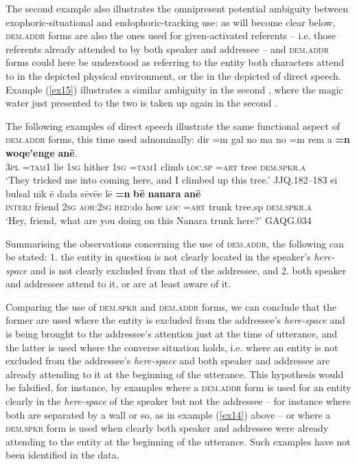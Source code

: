 \documentclass[output=paper
,modfonts
,nonflat]{langsci/langscibook}
\begin{document}
\noindent
The second example also illustrates the omnipresent potential ambiguity between exophoric-situational and endophoric-tracking use: as will become clear below, \textsc{dem.addr} forms are also the ones used for given-activated referents -- i.e. those referents already attended to by both speaker and addressee -- and \textsc{dem.addr} forms could here be understood as referring to the entity both characters attend to in the depicted physical environment, or the  in the depicted  of direct speech. Example (\ref{ex15}) illustrates a similar ambiguity in the second , where the magic water just presented to the two is taken up again in the second .

The following examples of direct speech illustrate the same functional aspect of \textsc{dem.addr} forms, this time used adnominally:
\ea	\label{ex21}
\gll		dir		=m		gal	no		ma	no		=m		rem	a			\textbf{=n}		\textbf{woqe'enge}	\textbf{an\=e}.	\\
\textsc{3pl}	\textsc{=tam1}	lie	\textsc{1sg}	hither		\textsc{1sg}	\textsc{=tam1}	climb	\textsc{loc.sp}	\textsc{=art}	tree			\textsc{dem.spkr.a}		\\
\glt	`They tricked me into coming here, and I climbed up this tree.'			\hfill{JJQ.182--183}
\z
\ea	\label{ex22}
\gll			{\textquotesingle}ei			bulsal	nik	\=e			dada		s\=ev\=ee	l\=e		\textbf{=n}		\textbf{b\=e}		\textbf{nanara}	\textbf{an\=e}	\\
\textsc{interj}	friend		\textsc{2sg}	\textsc{aor:2sg}	\textsc{red:}do	how	\textsc{loc}	\textsc{=art}	trunk	tree.sp		\textsc{dem.spkr.a}	\\
\glt	`Hey, friend, what are you doing on this Nanara trunk here?'	\hfill{GAQG.034}
\z

\noindent
Summarising the observations concerning the use of \textsc{dem.addr}, the following can be stated: 1. the entity in question is not clearly located in the speaker's \textit{here-space} and is not clearly excluded from that of the addressee, and 2. both speaker and addressee attend to it, or are at least aware of it.\largerpage

Comparing the use of \textsc{dem.spkr} and \textsc{dem.addr} forms, we can conclude that the former are used where the entity is excluded from the addressee's \textit{here-space} and is being brought to the addressee's attention just at the time of utterance, and the latter is used where the converse situation holds, i.e. where an entity is not excluded from the addressee's \textit{here-space} and both speaker and addressee are already attending to it at the beginning of the utterance. This hypothesis would be falsified, for instance, by examples where a \textsc{dem.addr} form is used for an entity clearly in the \textit{here-space} of the speaker but not the addressee -- for instance where both are separated by a wall or so, as in example (\ref{ex14}) above -- or where a \textsc{dem.spkr} form is used when clearly both speaker and addressee were already attending to the entity at the beginning of the utterance. Such examples have not been identified in the data.
\end{document}
